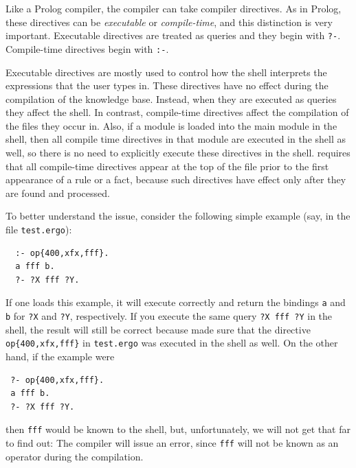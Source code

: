\documentclass[11pt]{article}
\newcommand{\ERGO}{\mbox{\smaller{\ensuremath{\cal{E}}\smaller{{\sc{RGO}}}}}\xspace}
\newcommand{\FLSYSTEM}{\ERGO}
\newcommand{\ergoext}{ergo\xspace}
\begin{document}
Like a Prolog compiler, the \FLSYSTEM compiler can take compiler directives.
As in Prolog, these directives can be \emph{executable} or
\emph{compile-time}, and this distinction is very important.
Executable directives are treated as queries and they begin with {\tt ?-}.
Compile-time directives begin with {\tt :-}.

Executable directives are mostly used to control how the \FLSYSTEM shell
interprets the expressions that the user types in. These directives have no
effect during the compilation of the knowledge base. Instead, when they are
executed as queries they affect the shell. In contrast, compile-time
directives affect the compilation of the files they occur in. Also, if a
module is loaded into the main module in the shell, then all compile time
directives in that module are executed in the shell as well, so there is no
need to explicitly execute these directives in the shell.
\FLSYSTEM requires
that all compile-time directives appear at the top of the file prior to
the first appearance of a rule or a fact, because such directives have
effect only after they are found and processed.

To better understand the issue, consider the following simple example
(say, in the file {\tt test.\ergoext}):
\begin{verbatim}
  :- op{400,xfx,fff}.
  a fff b.
  ?- ?X fff ?Y.
\end{verbatim}
If one loads this example, it will execute correctly and return the
bindings {\tt a} and {\tt b} for {\tt ?X} and {\tt ?Y}, respectively.
If you execute the same query {\tt ?X fff ?Y} in the \FLSYSTEM shell,
the result will still be correct because \FLSYSTEM made sure that the
directive {\tt op\{400,xfx,fff\}} in
{\tt test.\ergoext} was executed in the shell as well.
On the other hand, if the example were
\begin{verbatim}
 ?- op{400,xfx,fff}.
 a fff b.
 ?- ?X fff ?Y.
\end{verbatim}
then {\tt fff} would be known to the shell, but, unfortunately, we
will not get that far to find out: The compiler will issue an error, since
{\tt fff} will not be known as an operator during the compilation.
\end{document}
